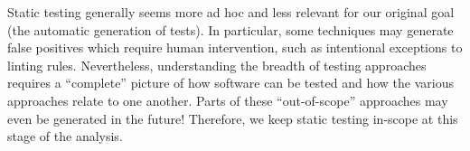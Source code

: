 
    Static testing generally seems more ad hoc and less relevant for our
    original goal (the automatic generation of tests). In particular,
    some techniques may generate false positives which require human intervention,
    such as intentional exceptions to linting rules. Nevertheless, understanding
    the breadth of testing approaches requires a ``complete'' picture of how
    software can be tested and how the various approaches relate to one another.
    Parts of these ``out-of-scope'' approaches may even be generated in the
    future! Therefore, we keep static testing in-scope at this stage of the
    analysis.

